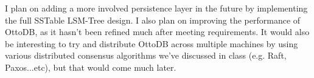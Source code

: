 \documentclass[conference]{IEEEtran}
\begin{document}
    I plan on adding a more involved persistence layer in the future by implementing the full SSTable LSM-Tree design. I also plan on improving the performance of OttoDB, as it hasn't been refined much after meeting requirements. It would also be interesting to try and distribute OttoDB across multiple machines by using various distributed consensus algorithms we've discussed in class (e.g. Raft, Paxos...etc), but that would come much later.



    
    
    
    
\end{document}
